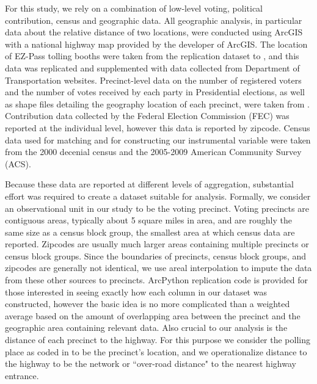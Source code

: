 For this study, we rely on a combination of low-level voting, political contribution, census and geographic data. All geographic analysis, in particular data about the relative distance of two locations, were conducted using ArcGIS with a national highway map provided by the developer of ArcGIS. The location of EZ-Pass tolling booths were taken from the replication dataset to \textcite{Currie2011}, and this data was replicated and supplemented with data collected from Department of Transportation websites. Precinct-level data on the number of registered voters and the number of votes received by each party in Presidential elections, as well as shape files detailing the geography location of each precinct, were taken from \textcite{Ansolabehere2014}. Contribution data collected by the Federal Election Commission (FEC) was reported at the individual level, however this data is reported by zipcode. Census data used for matching and for constructing our instrumental variable were taken from the 2000 decenial census and the 2005-2009 American Community Survey (ACS).

Because these data are reported at different levels of aggregation, substantial effort was required to create a dataset suitable for analysis. Formally, we consider an observational unit in our study to be the voting precinct. Voting precincts are contiguous areas, typically about 5 square miles in area, and are roughly the same size as a census block group, the smallest area at which census data are reported. Zipcodes are usually much larger areas containing multiple precincts or census block groups. Since the boundaries of precincts, census block groups, and zipcodes are generally not identical, we use areal interpolation to impute the data from these other sources to precincts. ArcPython replication code is provided for those interested in seeing exactly how each column in our dataset was constructed, however the basic idea is no more complicated than a weighted average based on the amount of overlapping area between the precinct and the geographic area containing relevant data. Also crucial to our analysis is the distance of each precinct to the highway. For this purpose we consider the polling place as coded in \textcite{Ansolabehere2014} to be the precinct's location, and we operationalize distance to the highway to be the network or ``over-road distance" to the nearest highway entrance.  